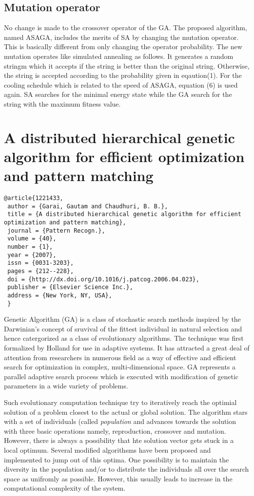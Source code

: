 \documentclass[pdftex,11pt]{article}
\begin{document}
\subsection{Mutation operator}
No change is made to the crossover operator of the GA. The proposed algorithm, named ASAGA, includes the merits of SA by changing the mutation operator. This is basically different from only changing the operator probability. The new mutation operates like simulated annealing as follows. It generates a random stringm which it accepts if the string is better than the original string. Otherwise, the string is accepted according to the probability given in eqaution(1). For the cooling schedule which is related to the speed of ASAGA, equation (6) is used again. SA searches for the minimal energy state while the GA search for the string with the maximum fitness value.

\section{A distributed hierarchical genetic algorithm for efficient optimization and pattern matching}
\begin{verbatim}
@article{1221433,
 author = {Garai, Gautam and Chaudhuri, B. B.},
 title = {A distributed hierarchical genetic algorithm for efficient optimization and pattern matching},
 journal = {Pattern Recogn.},
 volume = {40},
 number = {1},
 year = {2007},
 issn = {0031-3203},
 pages = {212--228},
 doi = {http://dx.doi.org/10.1016/j.patcog.2006.04.023},
 publisher = {Elsevier Science Inc.},
 address = {New York, NY, USA},
 }
\end{verbatim}

Genetic Algorithm (GA) is a class of stochastic search methods inspired by the Darwinian's concept of sruvival of the fittest individual in natural selection and hence catergorized as a class of evolutionary algorithms. The technique was first formalized by Holland for use in adaptive systems. It has attracted a great deal of attention from researchers in numerous field as a way of effective and efficient search for optimization in complex, multi-dimensional space. GA represents a parallel adaptive search process which is executed with modification of genetic parameters in a wide variety of problems.

Such evolutionary computation technique try to iteratively reach the optimial solution of a problem closest to the actual or global solution. The algorithm stars with a set of individuals (called \emph{population} and advances towards the solution with three basic operations namely, reproduction, crossover and mutation. However, there is always a possibility that hte solution vector gets stuck in a local optimum. Several modified algorithsms have been proposed and implemented to jump out of this optima. One possibility is to maintain the diversity in the population and/or to distribute the individuals all over the search space as unifromly as possible. However, this usually leads to increase in the computational complexity of the system.
\end{document}
